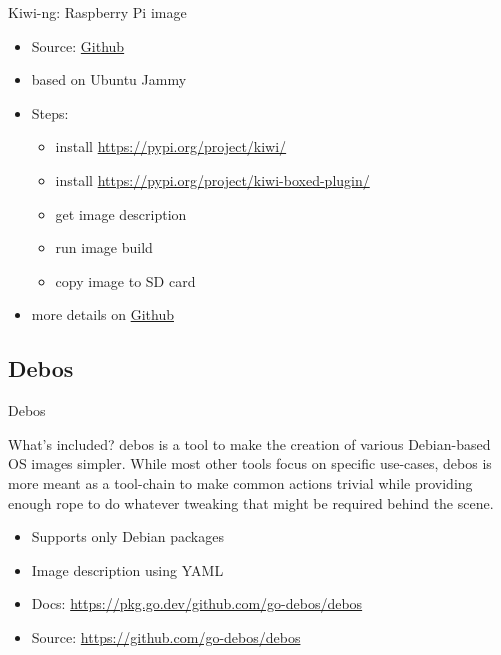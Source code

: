 \documentclass{beamer}
\begin{document}
\begin{frame}{Kiwi-ng: Raspberry Pi image}
	\begin{itemize}
		\item Source: \href{https://github.com/OSInside/kiwi-descriptions/tree/main/ubuntu/aarch64/ubuntu-jammy-rpi}{Github}
		\item based on Ubuntu Jammy
		\item Steps:
		\begin{itemize}
			\item install \url{https://pypi.org/project/kiwi/}
			\item install \url{https://pypi.org/project/kiwi-boxed-plugin/}
			\item get image description
			\item run image build
			\item copy image to SD card
		\end{itemize}
		\item more details on \href{https://github.com/tomirgang/eh21_maintainable_linux/tree/main/examples/first_build_rpi4/kiwi-ng}{Github}
	\end{itemize}
\end{frame}

\subsection{Debos}

\begin{frame}{Debos}
	\begin{block}{What's included?} 
		debos is a tool to make the creation of various Debian-based OS images simpler. While most other tools focus on specific use-cases, debos is more meant as a tool-chain to make common actions trivial while providing enough rope to do whatever tweaking that might be required behind the scene.
	\end{block}
	
	\begin{itemize}
		\item Supports only Debian packages
		\item Image description using YAML
		\item Docs: \url{https://pkg.go.dev/github.com/go-debos/debos}
		\item Source: \url{https://github.com/go-debos/debos}
	\end{itemize}
\end{frame}
\end{document}
